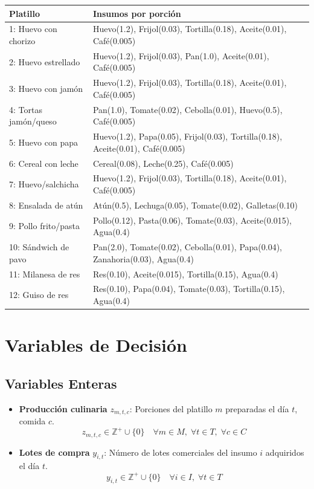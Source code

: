 \documentclass[12pt, letterpaper]{article}
\begin{document}
\begin{table}[h!]
\centering
\renewcommand{\arraystretch}{1.3}
\begin{tabular}{lp{10cm}}
\toprule
\textbf{Platillo} & \textbf{Insumos por porción} \\
\midrule
1: Huevo con chorizo    & Huevo(1.2), Frijol(0.03), Tortilla(0.18), Aceite(0.01), Café(0.005) \\
2: Huevo estrellado     & Huevo(1.2), Frijol(0.03), Pan(1.0), Aceite(0.01), Café(0.005) \\
3: Huevo con jamón      & Huevo(1.2), Frijol(0.03), Tortilla(0.18), Aceite(0.01), Café(0.005) \\
4: Tortas jamón/queso   & Pan(1.0), Tomate(0.02), Cebolla(0.01), Huevo(0.5), Café(0.005) \\
5: Huevo con papa       & Huevo(1.2), Papa(0.05), Frijol(0.03), Tortilla(0.18), Aceite(0.01), Café(0.005) \\
6: Cereal con leche     & Cereal(0.08), Leche(0.25), Café(0.005) \\
7: Huevo/salchicha      & Huevo(1.2), Frijol(0.03), Tortilla(0.18), Aceite(0.01), Café(0.005) \\
8: Ensalada de atún     & Atún(0.5), Lechuga(0.05), Tomate(0.02), Galletas(0.10) \\
9: Pollo frito/pasta    & Pollo(0.12), Pasta(0.06), Tomate(0.03), Aceite(0.015), Agua(0.4) \\
10: Sándwich de pavo    & Pan(2.0), Tomate(0.02), Cebolla(0.01), Papa(0.04), Zanahoria(0.03), Agua(0.4) \\
11: Milanesa de res     & Res(0.10), Aceite(0.015), Tortilla(0.15), Agua(0.4) \\
12: Guiso de res        & Res(0.10), Papa(0.04), Tomate(0.03), Tortilla(0.15), Agua(0.4) \\
\bottomrule
\end{tabular}
\end{table}

\section{Variables de Decisión}

\subsection{Variables Enteras}

\begin{itemize}
  \item \textbf{Producción culinaria} $z_{m,t,c}$: Porciones del platillo $m$ preparadas el día $t$, comida $c$.
  \[
    z_{m,t,c} \in \mathbb{Z}^+ \cup \{0\} \quad \forall m \in M,\; \forall t \in T,\; \forall c \in C
  \]
  \item \textbf{Lotes de compra} $y_{i,t}$: Número de lotes comerciales del insumo $i$ adquiridos el día $t$.
  \[
    y_{i,t} \in \mathbb{Z}^+ \cup \{0\} \quad \forall i \in I,\; \forall t \in T
  \]
\end{itemize}
\end{document}
